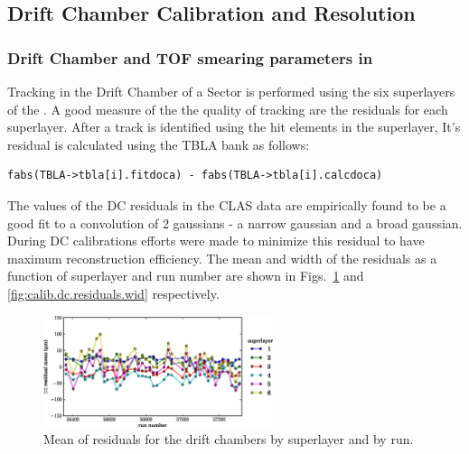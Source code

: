 \subsection{\label{sec:calib.dc}Drift Chamber Calibration and Resolution}

\subsubsection{\label{sec:DC.TOF.res}Drift Chamber and TOF smearing parameters in }

Tracking in the Drift Chamber of a  Sector is performed using the six superlayers of the . A good measure of the the quality of tracking are the  residuals for each superlayer. After a track is identified using the hit elements in the  superlayer, It's  residual is calculated using the TBLA bank as follows:

\begin{verbatim}
fabs(TBLA->tbla[i].fitdoca) - fabs(TBLA->tbla[i].calcdoca)
\end{verbatim}

The values of the DC residuals in the CLAS data are empirically found to be a good fit to a convolution of 2 gaussians - a narrow gaussian and a broad gaussian. During DC calibrations efforts were made to minimize this residual to have maximum reconstruction efficiency. The mean and width of the residuals as a function of superlayer and run number are shown in Figs.~\ref{fig:calib.dc.residuals.mean} and \ref{fig:calib.dc.residuals.wid} respectively.


\begin{figure}\begin{center}
\includegraphics[width=0.6\textwidth]{figures/calib/dc/dc_resid_mean.eps}
\caption[DC Residuals (Mean)]{\label{fig:calib.dc.residuals.mean}Mean of residuals for the drift chambers by superlayer and by run.}
\end{center}\end{figure}

